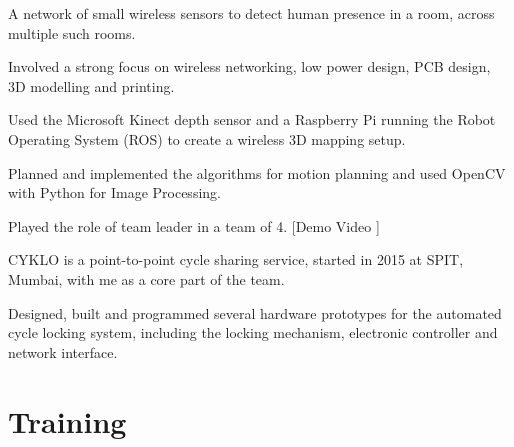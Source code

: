 \documentclass[]{deedy-resume-openfont}
\begin{document}
\begin{tightemize}
	\item A network of small wireless sensors to detect human presence in a room, across multiple such rooms.
	\item Involved a strong focus on wireless networking, low power design, PCB design, 3D modelling and printing.
\end{tightemize}
\sectionsep

\begin{tightemize}
	\item Used the Microsoft Kinect depth sensor and a Raspberry Pi running the Robot Operating System (ROS) to create a wireless 3D mapping setup.  
\end{tightemize}
\sectionsep

\descript{\phantom{.}}
\begin{tightemize}
	\item Planned and implemented the algorithms for motion planning and used OpenCV with Python for Image Processing.
	\item Played the role of team leader in a team of 4. [Demo Video \href{http://bit.ly/eyrc-demo}{\faYoutubePlay}]
\end{tightemize}
\sectionsep

\begin{tightemize}
	\item CYKLO is a point-to-point cycle sharing service, started in 2015 at SPIT, Mumbai, with me as a core part of the team.
	\item Designed, built and programmed several hardware prototypes for the automated cycle locking system, including the locking mechanism, electronic controller and network interface.
\end{tightemize}
\sectionsep


\section{Training}
\end{document}
